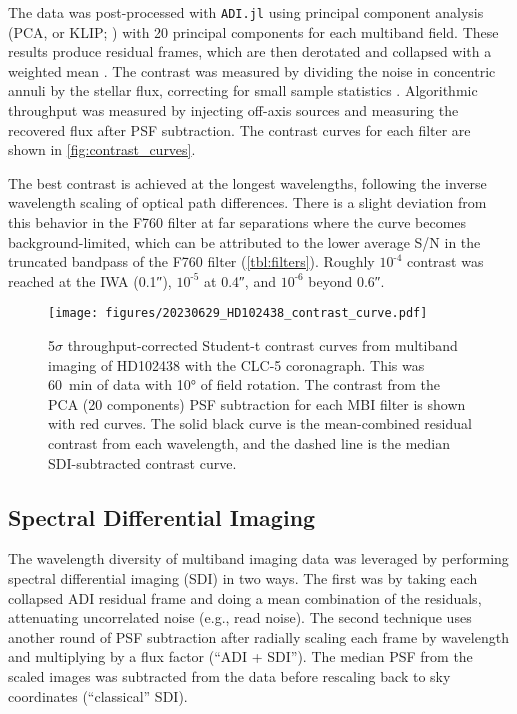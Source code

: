 The data was post-processed with \texttt{ADI.jl} \citep{lucas_adijl_2020} using principal component analysis (PCA, or KLIP; \citealt{soummer_detection_2012}) with 20 principal components for each multiband field. These results produce residual frames, which are then derotated and collapsed with a weighted mean \citep{bottom_noise-weighted_2017}. The contrast was measured by dividing the noise in concentric annuli by the stellar flux, correcting for small sample statistics \citep{mawet_fundamental_2014}. Algorithmic throughput was measured by injecting off-axis sources and measuring the recovered flux after PSF subtraction. The contrast curves for each filter are shown in \autoref{fig:contrast_curves}.

The best contrast is achieved at the longest wavelengths, following the inverse wavelength scaling of optical path differences. There is a slight deviation from this behavior in the F760 filter at far separations where the curve becomes background-limited, which can be attributed to the lower average S/N in the truncated bandpass of the F760 filter (\autoref{tbl:filters}). Roughly $10^{\text{-}4}$ contrast was reached at the IWA (\ang{;;0.1}), $10^{\text{-}5}$ at \ang{;;0.4}, and $10^{\text{-}6}$ beyond \ang{;;0.6}.


\begin{figure}
    \centering
    \texttt{[image: figures/20230629\_HD102438\_contrast\_curve.pdf]}
    \caption{5$\sigma$ throughput-corrected Student-t contrast curves from multiband imaging of HD102438 with the CLC-5 coronagraph. This was \SI{60}{\minute} of data with \ang{10} of field rotation. The contrast from the PCA (20 components) PSF subtraction for each MBI filter is shown with red curves. The solid black curve is the mean-combined residual contrast from each wavelength, and the dashed line is the median SDI-subtracted contrast curve. \label{fig:contrast_curves}}
\end{figure}


\subsection{Spectral Differential Imaging}\label{sec:sdi}

The wavelength diversity of multiband imaging data was leveraged by performing spectral differential imaging (SDI) in two ways. The first was by taking each collapsed ADI residual frame and doing a mean combination of the residuals, attenuating uncorrelated noise (e.g., read noise). The second technique uses another round of PSF subtraction after radially scaling each frame by wavelength and multiplying by a flux factor (``ADI + SDI''). The median PSF from the scaled images was subtracted from the data before rescaling back to sky coordinates (``classical'' SDI).

